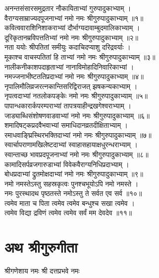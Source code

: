 अनन्तसंसारसमुद्रतार नौकायिताभ्यां गुरुपादुकाभ्याम् । \\
वैराग्यसाम्राज्यदपूजनाभ्यां नमो नमः श्रीगुरुपादुकाभ्याम् ॥१॥\\
कवित्ववाराशिनिशाकराभ्यां दौर्भाग्यदावाम्बुदमालिकाभ्याम् ।\\
दूरिकृतानम्रविपत्ततिभ्यां नमो नमः श्रीगुरुपादुकाभ्याम् ॥२॥\\
नता ययोः श्रीपतितां समीयुः कदाचिदप्याशु दरिद्रवर्याः ।\\
मूकाश्च वाचस्पतितां हि ताभ्यां नमो नमः श्रीगुरुपादुकाभ्याम् ॥३॥\\
नालीकनीकाशपदाहृताभ्यां नानाविमोहादिनिवारिकाभ्यां ।\\
नमज्जनाभीष्टततिप्रदाभ्यां नमो नमः श्रीगुरुपादुकाभ्याम् ॥४॥\\
नृपालिमौलिव्रजरत्नकान्तिसरिद्विराजत् झषकन्यकाभ्याम् ।\\
नृपत्वदाभ्यां नतलोकपङ्केः नमो नमः श्रीगुरुपादुकाभ्याम् ॥५॥\\
पापान्धकारार्कपरम्पराभ्यां तापत्रयाहीन्द्रखगेश्वराभ्याम् ।\\
जाड्याब्धिसंशोषणवाडवाभ्यां नमो नमः श्रीगुरुपादुकाभ्याम् ॥६॥\\
शमादिषट्कप्रदवैभवाभ्यां समाधिदानव्रतदीक्षिताभ्याम् ।\\
रमाधवाङ्घ्रिस्थिरभक्तिदाभ्यां नमो नमः श्रीगुरुपादुकाभ्याम् ॥७॥\\
स्वार्चापराणामखिलेष्टदाभ्यां स्वाहासहायाक्षधुरन्धराभ्याम् ।\\
स्वान्ताच्छ भावप्रदपूजनाभ्यां नमो नमः श्रीगुरुपादुकाभ्याम् ॥८॥\\
कामादिसर्पव्रजगारुडाभ्यां विवेकवैराग्यनिधिप्रदाभ्याम् ।\\
बोधप्रदाभ्यां द्रुतमोक्षदाभ्यां नमो नमः श्रीगुरुपादुकाभ्याम् ॥९॥\\
नमो नमस्तेऽस्तु सहस्रकृत्वः पुनश्चभूयोऽपि नमो नमस्ते ।\\
नमः पुरस्थादथ पृष्ठतस्ते नमोऽस्तु ते सर्वत एव सर्व ॥१०॥\\
त्वमेव माता च पिता त्वमेव त्वमेव बन्धुश्च सखा त्वमेव ।\\
त्वमेव विद्या द्रविणं त्वमेव त्वमेव सर्वं मम देवदेव ॥११॥

\section{अथ श्रीगुरुगीता}

\begin{center} \begin{small} श्रीगणेशाय नमः श्री दत्तप्रभवे नमः\end{small}\end{center}

